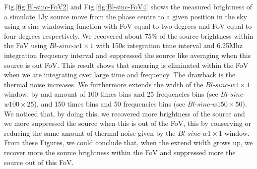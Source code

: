 \documentclass[useAMS,usenatbib]{mn2e}
\begin{document}
Fig.\ref{fig:Bl-sinc-FoV2} and Fig.\ref{fig:Bl-sinc-FoV4} shows the measured brightness of a simulate 1Jy source move from the phase centre 
to a given position in the sky using a sinc windowing function with FoV equal to two degrees and FoV equal to four degrees respectively. We 
recovered about 75\% of the source brightness within the FoV using $Bl$-$sinc$-$w1\times1$ with 150s integration time interval and 6.25Mhz 
integration frequency interval and suppressed the source like averaging when this source is out FoV. This result shows that smearing is 
eliminated within the FoV when we are integrating over large time and frequency. The drawback is the thermal noise increases. We 
furthermore extends the width of the $Bl$-$sinc$-$w1\times1$ window, by and amount of 100 times bins and 25 frequencies 
bins (see $Bl$-$sinc$-$w100\times25$), and 150 times bins and 50 frequencies bins (see $Bl$-$sinc$-$w150\times50$). We noticed that, by 
doing this, we recovered more brightness of the source and we more suppressed the source when this is out of the FoV, this by 
conserving or reducing the same amount of thermal noise given by the $Bl$-$sinc$-$w1\times1$ window. From these Figures, we could conclude 
that, when the extend width grows up, we recover more the source brightness within the FoV and suppressed more the source out of this FoV.  
\end{document}
